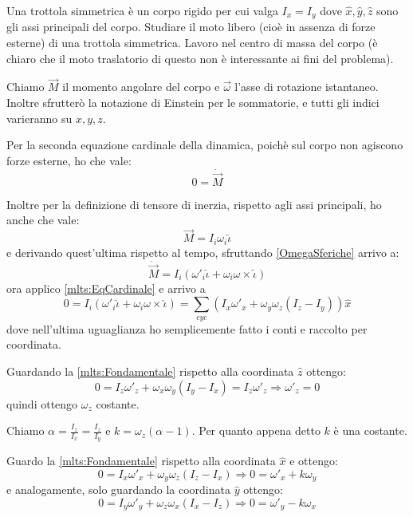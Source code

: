 \documentclass[../main.tex]{subfiles}
\begin{document}

\textex
Una trottola simmetrica è un corpo rigido per cui valga $I_x=I_y$ dove $\hat x, \hat y, \hat z$ sono gli assi principali del corpo.
Studiare il moto libero (cioè in assenza di forze esterne) di una trottola simmetrica.
\solution
Lavoro nel centro di massa del corpo (è chiaro che il moto traslatorio di questo non è interessante ai fini del problema).

Chiamo $\overrightarrow M$ il momento angolare del corpo e $\vec{\omega}$ l'asse di rotazione istantaneo. Inoltre sfrutterò la notazione di Einstein per le sommatorie, e tutti gli indici varieranno su $x,y,z$.

Per la seconda equazione cardinale della dinamica, poichè sul corpo non agiscono forze esterne, ho che vale:
\begin{equation}\label{mlts:EqCardinale}
	0=\dot{\overrightarrow M}
\end{equation}

Inoltre per la definizione di tensore di inerzia, rispetto agli assi principali, ho anche che vale:
\begin{equation*}
	\overrightarrow M = I_i\omega_i \hat\iota
\end{equation*}
e derivando quest'ultima rispetto al tempo, sfruttando \cref{OmegaSferiche} arrivo a:
\begin{equation*}
	\dot{\overrightarrow M}= I_i\left(\omega'_i\hat\iota + \omega_i\omega\times \hat\iota\right)
\end{equation*}
ora applico \cref{mlts:EqCardinale} e arrivo a
\begin{equation}\label{mlts:Fondamentale}
	0=I_i\left(\omega'_i\hat\iota + \omega_i\omega\times \hat\iota\right) =
	\sum_{cyc} \left( I_x\omega'_x+\omega_y\omega_z(I_z-I_y) \right)\hat x
\end{equation}
dove nell'ultima uguaglianza ho semplicemente fatto i conti e raccolto per coordinata.

Guardando la \cref{mlts:Fondamentale} rispetto alla coordinata $\hat z$ ottengo:
\begin{equation*} 
	0=I_z\omega'_z+\omega_x\omega_y(I_y-I_x)=I_z\omega'_z\Rightarrow \omega'_z=0
\end{equation*}
quindi ottengo $\omega_z$ costante.

Chiamo $\alpha=\frac{I_z}{I_x}=\frac{I_z}{I_y}$ e $k=\omega_z(\alpha-1)$. Per quanto appena detto $k$ è una costante.

Guardo la \cref{mlts:Fondamentale} rispetto alla coordinata $\hat x$ e ottengo:
\begin{equation}\label{mlts:x}
	0=I_x\omega'_x+\omega_y\omega_z(I_z-I_x)\Rightarrow 0=\omega'_x+k\omega_y
\end{equation}
e analogamente, solo guardando la coordinata $\hat y$ ottengo:
\begin{equation}\label{mlts:y}
	0=I_y\omega'_y+\omega_z\omega_x(I_x-I_z)\Rightarrow 0=\omega'_y-k\omega_x
\end{equation}
\end{document}
